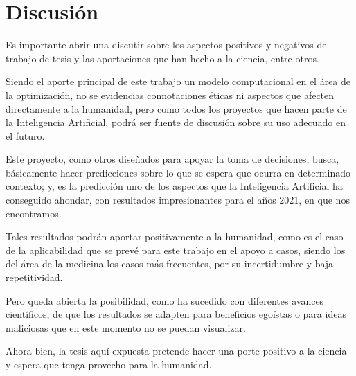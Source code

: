 \chapter{Discusión}
\label{discu}

Es importante abrir una discutir sobre los aspectos positivos y negativos del trabajo de tesis y las aportaciones que han hecho a la ciencia, entre otros.

Siendo el aporte principal de este trabajo un modelo computacional en el área de la optimización, no se evidencias connotaciones éticas ni aspectos que afecten directamente a la humanidad, pero como todos los proyectos que hacen parte de la Inteligencia Artificial, podrá ser fuente de discusión sobre su uso adecuado en el futuro.

Este proyecto, como otros diseñados para apoyar la toma de decisiones, busca, básicamente hacer predicciones sobre lo que se espera que ocurra en determinado contexto; y, es la predicción uno de los aspectos que la Inteligencia Artificial ha conseguido ahondar, con resultados impresionantes para el años 2021, en que nos encontramos.

Tales resultados podrán aportar positivamente a la humanidad, como es el caso de la aplicabilidad que se prevé para este trabajo en el apoyo a casos, siendo los del área de la medicina los casos más frecuentes, por su incertidumbre y baja repetitividad. 

Pero queda abierta la posibilidad, como ha sucedido con diferentes avances científicos, de que los resultados se adapten para beneficios egoístas o para ideas maliciosas que en este momento no se puedan visualizar.

Ahora bien, la tesis aquí expuesta pretende hacer una porte positivo a la ciencia y espera que tenga provecho para la humanidad.

